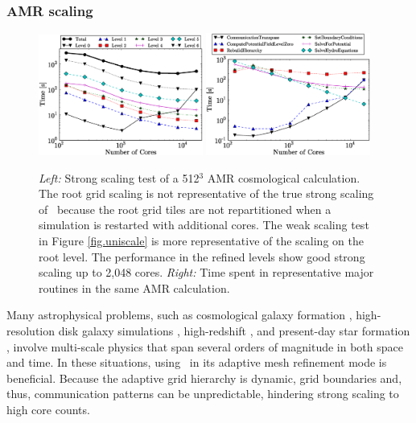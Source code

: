 \subsubsection{AMR scaling}

\begin{figure}
\begin{center}
\includegraphics[width=0.48\textwidth]{figures/strong_scaling_levels.eps}
\hfill
\includegraphics[width=0.48\textwidth]{figures/strong_scaling_routines.eps}
\end{center}
\caption{\emph{Left:} Strong scaling test of a 512$^3$ AMR
cosmological calculation.  The root grid scaling is not representative
of the true strong scaling of \enzo\ because the root grid tiles are not
repartitioned when a simulation is restarted with additional cores.
The weak scaling test in Figure \ref{fig.uniscale} is more
representative of the scaling on the root level.  The performance in
the refined levels show good strong scaling up to 2,048 cores.
\emph{Right:} Time spent in representative major routines in the same
AMR calculation.}
\label{fig:strong_scaling}
\end{figure}

Many astrophysical problems, such as cosmological galaxy formation
\citep{2012ApJ...749..140H}, high-resolution disk galaxy simulations
\citep{2011ApJ...738...54K}, high-redshift \citep{2009Sci...325..601T}, and present-day
star formation \citep{Collins12a}, involve multi-scale physics that
span several orders of magnitude in both space and time.  In these
situations, using \enzo\ in its adaptive mesh refinement mode is
beneficial.  Because the adaptive grid hierarchy is dynamic, grid
boundaries and, thus, communication patterns can be unpredictable,
hindering strong scaling to high core counts.

